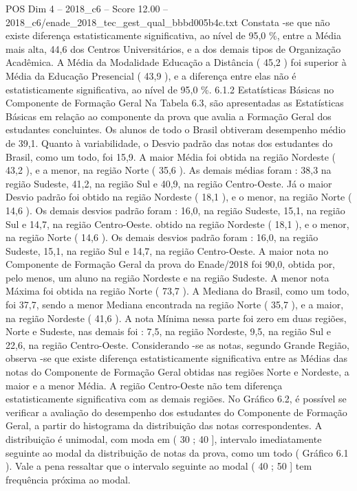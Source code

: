 \begin{textsample}{POS Dim 4 – 2018\_c6 – Score 12.00 – 2018\_c6/enade\_2018\_tec\_gest\_qual\_bbbd005b4c.txt}
Constata -se que não existe diferença estatisticamente significativa, ao nível de 95,0 \%, entre a Média mais alta, 44,6 dos Centros Universitários, e a dos demais tipos de Organização Acadêmica.
A Média da Modalidade Educação a Distância ( 45,2 ) foi superior à Média da Educação Presencial ( 43,9 ), e a diferença entre elas não é estatisticamente significativa, ao nível de 95,0 \%. 6.1.2 Estatísticas Básicas no Componente de Formação Geral Na Tabela 6.3, são apresentadas as Estatísticas Básicas em relação ao componente da prova que avalia a Formação Geral dos estudantes concluintes.
Os alunos de todo o Brasil obtiveram desempenho médio de 39,1.
Quanto à variabilidade, o Desvio padrão das notas dos estudantes do Brasil, como um todo, foi 15,9.
A maior Média foi obtida na região Nordeste ( 43,2 ), e a menor, na região Norte ( 35,6 ).
As demais médias foram : 38,3 na região Sudeste, 41,2, na região Sul e 40,9, na região Centro-Oeste.
Já o maior Desvio padrão foi obtido na região Nordeste ( 18,1 ), e o menor, na região Norte ( 14,6 ).
Os demais desvios padrão foram : 16,0, na região Sudeste, 15,1, na região Sul e 14,7, na região Centro-Oeste. obtido na região Nordeste ( 18,1 ), e o menor, na região Norte ( 14,6 ).
Os demais desvios padrão foram : 16,0, na região Sudeste, 15,1, na região Sul e 14,7, na região Centro-Oeste.
A maior nota no Componente de Formação Geral da prova do Enade/2018 foi 90,0, obtida por, pelo menos, um aluno na região Nordeste e na região Sudeste.
A menor nota Máxima foi obtida na região Norte ( 73,7 ).
A Mediana do Brasil, como um todo, foi 37,7, sendo a menor Mediana encontrada na região Norte ( 35,7 ), e a maior, na região Nordeste ( 41,6 ).
A nota Mínima nessa parte foi zero em duas regiões, Norte e Sudeste, nas demais foi : 7,5, na região Nordeste, 9,5, na região Sul e 22,6, na região Centro-Oeste.
Considerando -se as notas, segundo Grande Região, observa -se que existe diferença estatisticamente significativa entre as Médias das notas do Componente de Formação Geral obtidas nas regiões Norte e Nordeste, a maior e a menor Média.
A região Centro-Oeste não tem diferença estatisticamente significativa com as demais regiões.
No Gráfico 6.2, é possível se verificar a avaliação do desempenho dos estudantes do Componente de Formação Geral, a partir do histograma da distribuição das notas correspondentes.
A distribuição é unimodal, com moda em ( 30 ; 40 ], intervalo imediatamente seguinte ao modal da distribuição de notas da prova, como um todo ( Gráfico 6.1 ).
Vale a pena ressaltar que o intervalo seguinte ao modal ( 40 ; 50 ] tem frequência próxima ao modal.

\end{textsample}
